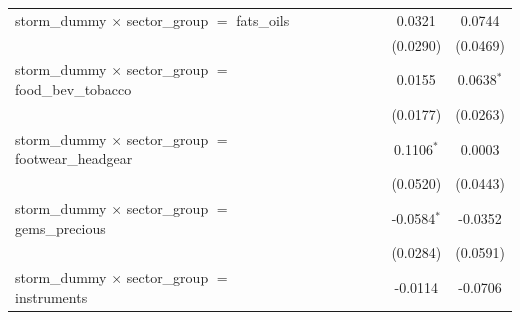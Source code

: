 \begin{tabular}{lcccccccc}
   storm\_dummy $\times$ sector\_group $=$ fats\_oils                             &                       &                       &                       &                       &                       &                       & 0.0321                & 0.0744\\   
                                                                                  &                       &                       &                       &                       &                       &                       & (0.0290)              & (0.0469)\\   
   storm\_dummy $\times$ sector\_group $=$ food\_bev\_tobacco                     &                       &                       &                       &                       &                       &                       & 0.0155                & 0.0638$^{*}$\\   
                                                                                  &                       &                       &                       &                       &                       &                       & (0.0177)              & (0.0263)\\   
   storm\_dummy $\times$ sector\_group $=$ footwear\_headgear                     &                       &                       &                       &                       &                       &                       & 0.1106$^{*}$          & 0.0003\\   
                                                                                  &                       &                       &                       &                       &                       &                       & (0.0520)              & (0.0443)\\   
   storm\_dummy $\times$ sector\_group $=$ gems\_precious                         &                       &                       &                       &                       &                       &                       & -0.0584$^{*}$         & -0.0352\\   
                                                                                  &                       &                       &                       &                       &                       &                       & (0.0284)              & (0.0591)\\   
   storm\_dummy $\times$ sector\_group $=$ instruments                            &                       &                       &                       &                       &                       &                       & -0.0114               & -0.0706\\   

\end{tabular}
